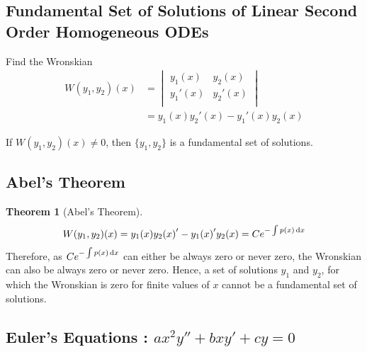 \documentclass[fleqn, a4paper, 12pt, twoside]{article}
\theoremstyle{definition}
\theoremstyle{theorem}
\newtheorem{theorem}{Theorem}
\begin{document}
\subsection{Fundamental Set of Solutions of Linear Second Order Homogeneous ODEs}

\begin{algorithmic}[1]
	\item
		Find the Wronskian
		\begin{align*}
			W(y_1, y_2)(x) &=
				\begin{vmatrix}
					y_1(x) & y_2(x)\\
					{y_1}'(x) & {y_2}'(x)\\
				\end{vmatrix}\\
			&= y_1(x) {y_2}'(x) - {y_1}'(x) y_2(x)
		\end{align*}
	\item
		If $W(y_1, y_2)(x) \neq 0$, then $\{y_1, y_2\}$ is a fundamental set of solutions.
\end{algorithmic}

\subsection{Abel's Theorem}

\begin{theorem}[Abel's Theorem]
	\begin{equation*}
		W(y_1, y_2)(x) = y_1(x) {y_2(x)}' - {y_1(x)}' y_2(x) = C e^{-\int p(x) \dif x}
	\end{equation*}
	Therefore, as $C e^{-\int p(x) \dif x}$ can either be always zero or never zero, the Wronskian can also be always zero or never zero.
	Hence, a set of solutions $y_1$ and $y_2$, for which the Wronskian is zero for finite values of $x$ cannot be a fundamental set of solutions.
\end{theorem}

\subsection{Euler's Equations : $a x^2 y'' + b x y' + c y = 0$}
\end{document}
